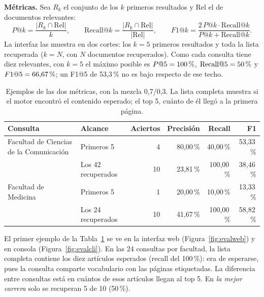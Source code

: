 \documentclass[11pt,letterpaper]{article}
\begin{document}
	\textbf{Métricas.} Sea \(R_k\) el conjunto de los \(k\) primeros resultados y \(\mathrm{Rel}\) el de documentos relevantes:
	\begin{equation}
		P@k=\frac{|R_k\cap \mathrm{Rel}|}{k},\qquad
		\mathrm{Recall}@k=\frac{|R_k\cap \mathrm{Rel}|}{|\mathrm{Rel}|},\qquad
		F1@k=\frac{2\,P@k\cdot\mathrm{Recall}@k}{P@k+\mathrm{Recall}@k}.
	\end{equation}
	La interfaz las muestra en dos cortes: los \(k=5\) primeros resultados y toda la lista recuperada (\(k=N\), con \(N\) documentos recuperados). Como cada consulta tiene diez relevantes, con \(k=5\) el máximo posible es \(P@5=100\,\text{\char37}\), \(\mathrm{Recall}@5=50\,\text{\char37}\) y \(F1@5=66{,}67\,\text{\char37}\); un F1@5 de 53,3\,\% no es bajo respecto de ese techo.
	
	\begin{table}[!htbp]
		\centering
		\caption{Ejemplos de las dos métricas, con la mezcla 0,7/0,3. La lista completa muestra si el motor encontró el contenido esperado; el top 5, cuánto de él llegó a la primera página.}\label{tab:ejemplos}
		\small
		\begin{tabularx}{\linewidth}{@{}l l r r r r@{}}
			\toprule
			\rowcolor{wash}\textbf{Consulta} & \textbf{Alcance} & \textbf{Aciertos} & \textbf{Precisión} & \textbf{Recall} & \textbf{F1}\\
			\midrule
			Facultad de Ciencias de la Comunicación & Primeros 5 & 4 & 80,00\,\% & 40,00\,\% & 53,33\,\%\\
			& Los 42 recuperados & 10 & 23,81\,\% & 100,00\,\% & 38,46\,\%\\
			\addlinespace
			Facultad de Medicina & Primeros 5 & 1 & 20,00\,\% & 10,00\,\% & 13,33\,\%\\
			& Los 24 recuperados & 10 & 41,67\,\% & 100,00\,\% & 58,82\,\%\\
			\bottomrule
		\end{tabularx}
	\end{table}
	
	El primer ejemplo de la Tabla~\ref{tab:ejemplos} se ve en la interfaz web (Figura~\ref{fig:evalweb}) y en consola (Figura~\ref{fig:evalcli}). En las 24 consultas por facultad, la lista completa contiene los diez artículos esperados (recall del 100\,\%): era de esperarse, pues la consulta comparte vocabulario con las páginas etiquetadas. La diferencia entre consultas está en cuántos de esos artículos llegan al top 5. En \emph{la mejor carrera} solo se recuperan 5 de 10 (50\,\%).
	
\end{document}
